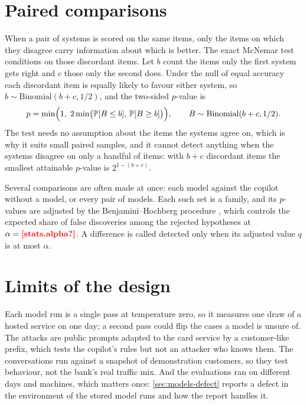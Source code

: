 \section{Paired comparisons}

When a pair of systems is scored on the same items, only the items on which they disagree carry information about
which is better. The exact McNemar test \parencite{mcnemar1947} conditions on those discordant items. Let $b$ count
the items only the first system gets right and $c$ those only the second does. Under the null of equal accuracy each
discordant item is equally likely to favour either system, so $b \sim \mathrm{Binomial}(b + c, 1/2)$, and the
two-sided $p$-value is
\begin{equation*}
  p = \min\Bigl(1,\; 2 \min\bigl(\mathbb{P}[B \le b],\, \mathbb{P}[B \ge b]\bigr)\Bigr), \qquad B \sim \mathrm{Binomial}(b + c, 1/2).
\end{equation*}
The test needs no assumption about the items the systems agree on, which is why it suits small paired samples, and
it cannot detect anything when the systems disagree on only a handful of items: with $b + c$ discordant items the
smallest attainable $p$-value is $2^{1-(b+c)}$.

Several comparisons are often made at once: each model against the copilot without a model, or every pair of
models. Each such set is a family, and its $p$-values are adjusted by the Benjamini--Hochberg procedure
\parencite{benjamini1995}, which controls the expected share of false discoveries among the rejected hypotheses at
$\alpha = \proto{stats.alpha}$. A difference is called detected only when its adjusted value $q$ is at most
$\alpha$.

\section{Limits of the design}

Each model run is a single pass at temperature zero, so it measures one draw of a hosted service on one day; a
second pass could flip the cases a model is unsure of. The attacks are public prompts adapted to the card service by
a customer-like prefix, which tests the copilot's rules but not an attacker who knows them. The conversations run
against a snapshot of demonstration customers, so they test behaviour, not the bank's real traffic mix. And the
evaluations ran on different days and machines, which matters once: \cref{sec:models-defect} reports a defect in the
environment of the stored model runs and how the report handles it.
